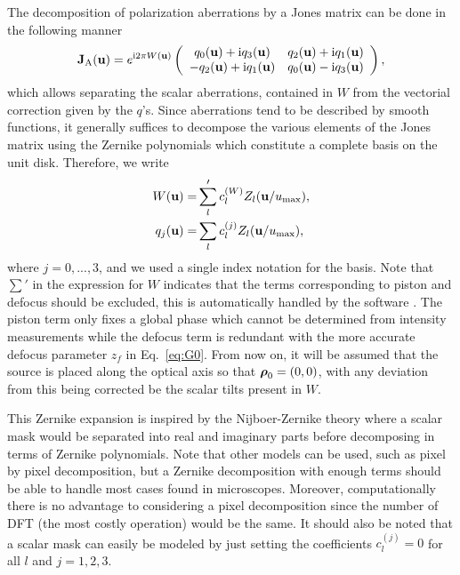 \documentclass[reprint,aps,pra,superscriptaddress,
amsmath,amssymb]{revtex4-1}
\begin{document}
The decomposition of polarization aberrations by a Jones matrix can be 
done in the following manner
\begin{align} \label{eq:jqw}
  \textbf J_\text{A}(\textbf u) = e^{\text{i} 2\pi W(\textbf u)} \left(
\begin{array}{cc}
q_0(\textbf u) + \text{i} q_3(\textbf u) &q_2(\textbf u) + \text{i} q_1(\textbf u) \\
-q_2(\textbf u) + \text{i} q_1(\textbf u) & q_0(\textbf u) - \text{i} q_3(\textbf u)
\end{array}
\right),
\end{align}
which allows separating the scalar aberrations, contained 
in $W$ from the vectorial correction given by the $q$'s. 
Since aberrations tend to be described by smooth functions, it generally 
suffices to decompose the various elements of the Jones matrix using the 
Zernike polynomials which constitute a complete basis on the unit disk.
Therefore, we write
\begin{align}
  W (\textbf u) = &\sum'_l c_{l}^{(W)} Z_l(\textbf u/u_\text{max}) ,\\
  q_{j} (\textbf u) = &\sum_l c_{l}^{(j)} Z_l(\textbf u/u_\text{max}),
\end{align}
where $j=0,...,3$, and we used a single index notation for the basis. 
Note that $\sum'$ in the expression for $W$ indicates that the terms 
corresponding to piston and defocus should be excluded, this is 
automatically handled by the software \cite{}. The piston term only 
fixes a global phase which cannot be determined from intensity measurements
while the defocus term is redundant with the more accurate defocus parameter
$z_f$ in Eq.~\ref{eq:G0}. 
From now on, it will be assumed that the source is placed  
along the optical axis so that $\boldsymbol \rho_0 = (0,0)$, with
any deviation from this being corrected be the scalar tilts 
present in $W$.

This Zernike expansion is inspired by the Nijboer-Zernike theory 
\cite{janssen2002extended,braat2003extended,braat2005extended} where a 
scalar mask would be separated into real and imaginary parts before 
decomposing in terms of Zernike polynomials. 
Note that other models can be used, such as 
pixel by pixel decomposition, but a Zernike decomposition with enough 
terms should be able to handle most cases found in microscopes. Moreover, 
computationally there is no advantage to considering a pixel decomposition 
since the number of DFT (the most costly operation) would be the same.
It should also  be noted that a scalar mask can easily be modeled by just
setting the coefficients $c^{(j)}_l=0$ for all $l$ and $j=1,2,3$.
\end{document}

